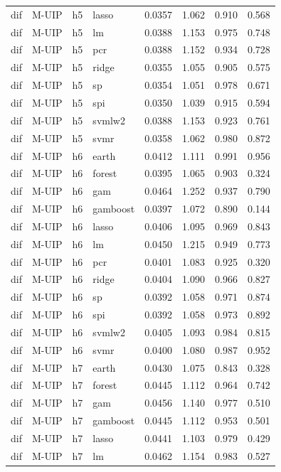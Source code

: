 \begin{ThreePartTable}
\begin{longtable}[t]{llclcccc}
dif & M-UIP & h5 & lasso & 0.0357 & 1.062 & 0.910 & 0.568\\
dif & M-UIP & h5 & lm & 0.0388 & 1.153 & 0.975 & 0.748\\
dif & M-UIP & h5 & pcr & 0.0388 & 1.152 & 0.934 & 0.728\\
dif & M-UIP & h5 & ridge & 0.0355 & 1.055 & 0.905 & 0.575\\
dif & M-UIP & h5 & sp & 0.0354 & 1.051 & 0.978 & 0.671\\
dif & M-UIP & h5 & spi & 0.0350 & 1.039 & 0.915 & 0.594\\
dif & M-UIP & h5 & svmlw2 & 0.0388 & 1.153 & 0.923 & 0.761\\
dif & M-UIP & h5 & svmr & 0.0358 & 1.062 & 0.980 & 0.872\\
\addlinespace
dif & M-UIP & h6 & earth & 0.0412 & 1.111 & 0.991 & 0.956\\
dif & M-UIP & h6 & forest & 0.0395 & 1.065 & 0.903 & 0.324\\
dif & M-UIP & h6 & gam & 0.0464 & 1.252 & 0.937 & 0.790\\
dif & M-UIP & h6 & gamboost & 0.0397 & 1.072 & 0.890 & 0.144\\
dif & M-UIP & h6 & lasso & 0.0406 & 1.095 & 0.969 & 0.843\\
dif & M-UIP & h6 & lm & 0.0450 & 1.215 & 0.949 & 0.773\\
dif & M-UIP & h6 & pcr & 0.0401 & 1.083 & 0.925 & 0.320\\
dif & M-UIP & h6 & ridge & 0.0404 & 1.090 & 0.966 & 0.827\\
dif & M-UIP & h6 & sp & 0.0392 & 1.058 & 0.971 & 0.874\\
dif & M-UIP & h6 & spi & 0.0392 & 1.058 & 0.973 & 0.892\\
dif & M-UIP & h6 & svmlw2 & 0.0405 & 1.093 & 0.984 & 0.815\\
dif & M-UIP & h6 & svmr & 0.0400 & 1.080 & 0.987 & 0.952\\
\addlinespace
dif & M-UIP & h7 & earth & 0.0430 & 1.075 & 0.843 & 0.328\\
dif & M-UIP & h7 & forest & 0.0445 & 1.112 & 0.964 & 0.742\\
dif & M-UIP & h7 & gam & 0.0456 & 1.140 & 0.977 & 0.510\\
dif & M-UIP & h7 & gamboost & 0.0445 & 1.112 & 0.953 & 0.501\\
dif & M-UIP & h7 & lasso & 0.0441 & 1.103 & 0.979 & 0.429\\
dif & M-UIP & h7 & lm & 0.0462 & 1.154 & 0.983 & 0.527\\

\end{longtable}
\end{ThreePartTable}
